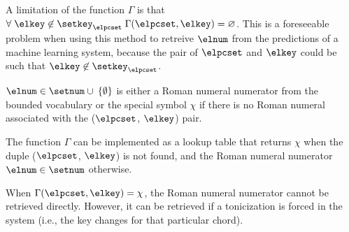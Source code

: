 A limitation of the function $\Gamma$ is that $\forall \;
\elkey \not\in \setkey_\elpcset \; \Gamma(\elpcset, \elkey)
= \varnothing$. This is a foreseeable problem when using
this method to retreive $\elnum$ from the predictions of a
machine learning system, because the pair of $\elpcset$ and
$\elkey$ could be such that $\elkey \not\in
\setkey_\elpcset$.

$\elnum \in \setnum \cup \: \{ \emptyset \}$ is either a
Roman numeral numerator from the bounded vocabulary or the
special symbol $\chi$ if there is no Roman numeral
associated with the ($\elpcset$, $\elkey$) pair.

The function $\Gamma$ can be implemented as a lookup table
that returns $\chi$ when the duple ($\elpcset$, $\elkey$) is
not found, and the Roman numeral numerator $\elnum \in
\setnum$ otherwise.

When $\Gamma(\elpcset, \elkey) = \chi$, the Roman numeral
numerator cannot be retrieved directly. However, it can be
retrieved if a tonicization is forced in the system (i.e.,
the key changes for that particular chord).

